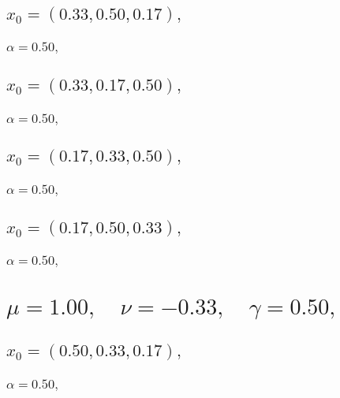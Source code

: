 \documentclass[a4paper]{article}
\begin{document}
\begin{multicols*}{2}
   \subsection{\(x_0 = (0.33,0.50,0.17),\quad \)}
   

   \subsubsection{\(\alpha = 0.50,\quad \)}
   

   \subsection{\(x_0 = (0.33,0.17,0.50),\quad \)}
   

   \subsubsection{\(\alpha = 0.50,\quad \)}
   

   \subsection{\(x_0 = (0.17,0.33,0.50),\quad \)}
   

   \subsubsection{\(\alpha = 0.50,\quad \)}
   

   \subsection{\(x_0 = (0.17,0.50,0.33),\quad \)}
   

   \subsubsection{\(\alpha = 0.50,\quad \)}
   

   \section{\(\mu = 1.00,\quad \nu = -0.33,\quad \gamma = 0.50,\quad \)}
   

   \subsection{\(x_0 = (0.50,0.33,0.17),\quad \)}
   

   \subsubsection{\(\alpha = 0.50,\quad \)}
   


\end{multicols*}
\end{document}
